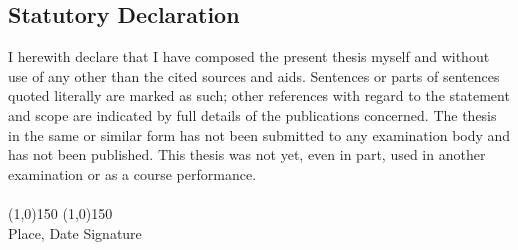\thispagestyle{empty}
\begin{center}
	\section*{Statutory Declaration}
\end{center}
\vspace*{1cm}
\noindent
I herewith declare that I have composed the present thesis myself and without use of any other than the
cited sources and aids. Sentences or parts of sentences quoted literally are marked as such; other references
with regard to the statement and scope are indicated by full details of the publications concerned. The thesis
in the same or similar form has not been submitted to any examination body and has not been published.
This thesis was not yet, even in part, used in another examination or as a course performance.
\vspace*{1cm}
~\\
~\\
\line(1,0){150} \hfill \line(1,0){150}\\
Place, Date \hfill Signature \hspace*{3cm}
\vspace*{1.5cm}
